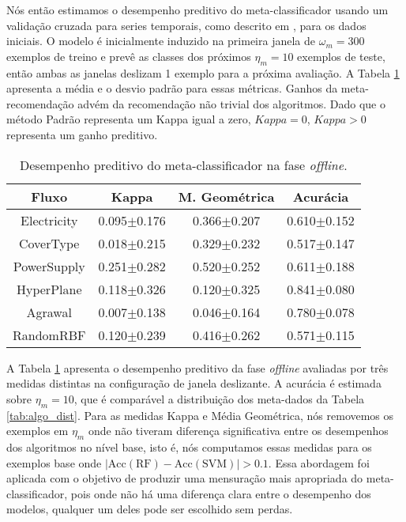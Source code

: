 Nós então estimamos o desempenho preditivo do meta-classificador usando um validação cruzada para series temporais, como descrito em \cite{hyndman2018forecasting}, para os dados iniciais. O modelo é inicialmente induzido na primeira janela de $\omega_m=300$ exemplos de treino e prevê as classes dos próximos $\eta_m=10$ exemplos de teste, então ambas as janelas deslizam 1 exemplo para a próxima avaliação. A Tabela \ref{tab:offmetrics} apresenta a média e o desvio padrão para essas métricas. Ganhos da meta-recomendação advém da recomendação não trivial dos algoritmos. Dado que o método Padrão representa um Kappa igual a zero, $Kappa=0$, $Kappa > 0$ representa um ganho preditivo.


\begin{table}[ht]
\caption{Desempenho preditivo do meta-classificador na fase \textit{offline}.}
\label{tab:offmetrics}
\centering
\begin{tabular}{c|c|c|c}\hline
    Fluxo   & Kappa           & M. Geométrica   & Acurácia        \\ \hline
Electricity & 0.095$\pm$0.176 & 0.366$\pm$0.207 & 0.610$\pm$0.152 \\
CoverType   & 0.018$\pm$0.215 & 0.329$\pm$0.232 & 0.517$\pm$0.147 \\
PowerSupply & 0.251$\pm$0.282 & 0.520$\pm$0.252 & 0.611$\pm$0.188 \\ \hline
HyperPlane  & 0.118$\pm$0.326 & 0.120$\pm$0.325 & 0.841$\pm$0.080 \\
Agrawal     & 0.007$\pm$0.138 & 0.046$\pm$0.164 & 0.780$\pm$0.078 \\
RandomRBF   & 0.120$\pm$0.239 & 0.416$\pm$0.262 & 0.571$\pm$0.115 \\
\end{tabular}
\end{table}

A Tabela \ref{tab:offmetrics} apresenta o desempenho preditivo da fase \textit{offline} avaliadas por três medidas distintas na configuração de janela deslizante. A acurácia é estimada sobre $\eta_m=10$, que é comparável a distribuição dos meta-dados da Tabela \ref{tab:algo_dist}. Para as medidas Kappa e Média Geométrica, nós removemos os exemplos em $\eta_m$ onde não tiveram diferença significativa entre os desempenhos dos algoritmos no nível base, isto é, nós computamos essas medidas para os exemplos base onde $|\text{Acc}(\text{RF})-\text{Acc}(\text{SVM})| > 0.1$. Essa abordagem foi aplicada com o objetivo de produzir uma mensuração mais apropriada do meta-classificador, pois onde não há uma diferença clara entre o desempenho dos modelos, qualquer um deles pode ser escolhido sem perdas.

